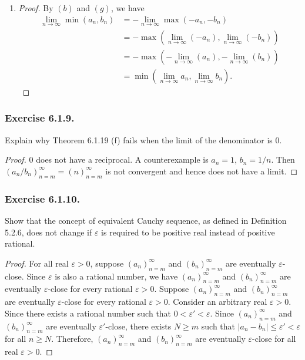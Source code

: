 \documentclass[12pt, letter]{article}
\newcommand{\an}{(a_n)_{n=m}^\infty}
\newcommand{\bn}{(b_n)_{n=m}^\infty}
\begin{document}
\begin{enumerate}[label=(\alph*)]
\begin{proof}
        Similarly, we can show that if $y>x$, there exists $M\geq m$ such that $|\max(a_n,b_n)-\max(x,y)|=|b_n-y|\leq \varepsilon$ for all $n\geq M$. Thus, $(\max(a_n,b_n))_{n=m}^\infty$ converges to $\max(x,y)$.
    \end{proof}
    \item \begin{proof}
        By $(b)$ and $(g)$, we have 
        \begin{equation*}
            \begin{aligned}
                \lim_{n\to\infty}\min(a_n,b_n)&=-\lim_{n\to\infty}\max(-a_n,-b_n)\\
                &=-\max(\lim_{n\to\infty}(-a_n),\lim_{n\to\infty}(-b_n))\\
                &=-\max(-\lim_{n\to\infty}(a_n),-\lim_{n\to\infty}(b_n))\\
                &=\min(\lim_{n\to\infty}a_n,\lim_{n\to\infty}b_n).
            \end{aligned}
        \end{equation*}
    \end{proof}
\end{enumerate}
\subsubsection*{Exercise 6.1.9.}
Explain why Theorem 6.1.19 (f) fails when the limit of the denominator is 0.
\begin{proof}
    0 does not have a reciprocal. A counterexample is $a_n=1$, $b_n=1/n$. Then $(a_n/b_n)_{n=m}^\infty=(n)_{n=m}^\infty$ is not convergent and hence does not have a limit. 
\end{proof}
\subsubsection*{Exercise 6.1.10.}
Show that the concept of equivalent Cauchy sequence, as defined in Definition 5.2.6, does not change if $\varepsilon$ is required to be positive real instead of positive rational.
\begin{proof}
    For all real $\varepsilon>0$, suppose $\an$ and $\bn$ are eventually $\varepsilon$-close. Since $\varepsilon$ is also a rational number, we have $\an$ and $\bn$ are eventually $\varepsilon$-close for every rational $\varepsilon>0$.
    Suppose $\an$ and $\bn$ are eventually $\varepsilon$-close for every rational $\varepsilon>0$. Consider an arbitrary real $\varepsilon>0$. Since there exists a rational number such that $0<\varepsilon'<\varepsilon$.
    Since $\an$ and $\bn$ are eventually $\varepsilon'$-close, there exists $N\geq m$ such that $|a_n-b_n|\leq\varepsilon'<\varepsilon$ for all $n\geq N$. Therefore, $\an$ and $\bn$
    are eventually $\varepsilon$-close for all real $\varepsilon>0$.
\end{proof}
\end{document}
